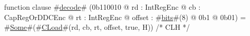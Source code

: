 function clause #\hyperref[zdecode]{decode}# (0b110010 @ rd : IntRegEnc @ cb : CapRegOrDDCEnc @ rt : IntRegEnc @ offset : #\hyperref[zbits]{bits}#(8) @ 0b1 @ 0b01) = #\hyperref[zSome]{Some}#(#\hyperref[zCLoad]{CLoad}#(rd, cb, rt, offset, true,  H)) /* CLH */
